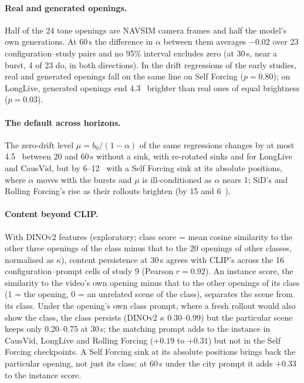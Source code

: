 \paragraph{Real and generated openings.} Half of the 24 tone openings are NAVSIM camera frames and half the model's own
generations. At 60\,s the difference in $\alpha$ between them averages $-0.02$ over 23 configuration--study pairs and
no 95\% interval excludes zero (at 30\,s, near a burst, 4 of 23 do, in both directions). In the drift regressions of
the early studies, real and generated openings fall on the same line on Self Forcing ($p=0.80$); on LongLive,
generated openings end 4.3~\Lstar{} brighter than real ones of equal brightness ($p=0.03$).

\paragraph{The default across horizons.} The zero-drift level $\mu=b_0/(1-\alpha)$ of the same regressions changes by
at most 4.5~\Lstar{} between 20 and 60\,s without a sink, with re-rotated sinks and for LongLive and CausVid, but by
6--12~\Lstar{} with a Self Forcing sink at its absolute positions, where $\alpha$ moves with the bursts and $\mu$ is
ill-conditioned as $\alpha$ nears 1; SiD's and Rolling Forcing's rise as their rollouts brighten (by 15 and
6~\Lstar).

\paragraph{Content beyond CLIP.} With DINOv2 features (exploratory; class score = mean cosine similarity to the other
three openings of the class minus that to the 20 openings of other classes, normalised as $\kappa$), content
persistence at 30\,s agrees with CLIP's across the 16 configuration--prompt cells of study 9 (Pearson $r=0.92$). An
instance score, the similarity to the video's own opening minus that to the other openings of its class (1 = the
opening, 0 = an unrelated scene of the class), separates the scene from its class. Under the opening's own class
prompt, where a fresh rollout would also show the class, the class persists (DINOv2 $\kappa$ 0.30--0.99) but the
particular scene keeps only 0.20--0.75 at 30\,s; the matching prompt adds to the instance in CausVid, LongLive and
Rolling Forcing ($+0.19$ to $+0.31$) but not in the Self Forcing checkpoints. A Self Forcing sink at its absolute
positions brings back the particular opening, not just its class: at 60\,s under the city prompt it adds $+0.33$
 to the instance score.

